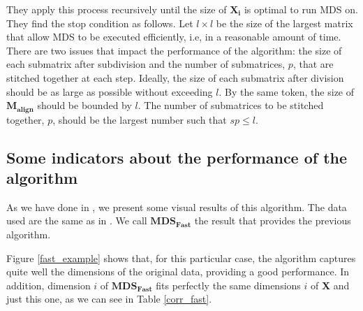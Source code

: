\documentclass[11pt]{report}
\begin{document}
\indent They apply this process recursively until the size of $\mathbf{X_i}$ is
optimal to run MDS on. They find the stop condition as follows. Let 
$l \times l$ be the size of the largest matrix that allow MDS to be executed 
efficiently, i.e, in a reasonable amount of time. There are two issues that 
impact the performance of the algorithm: the size of each submatrix after 
subdivision and the number of submatrices, $p$, that are stitched together 
at each step. Ideally, the size of each submatrix after division should 
be as large as possible without exceeding $l$. By the same token, the size of 
$\mathbf{M_{align}}$ should be bounded by $l$. The number of 
submatrices to be stitched together, $p$, should be the largest number such 
that $sp \leq l$.

\subsection{Some indicators about the performance of the algorithm}
As we have done in , we present some visual results of
this algorithm. The data used are the same as in . We
call $\mathbf{MDS_{Fast}}$ the result that provides the previous algorithm.

\indent Figure \ref{fast_example} shows that, for this particular case,
the algorithm captures quite well the dimensions of the original data, 
providing a good performance. In addition, dimension $i$ of 
$\mathbf{MDS_{Fast}}$ fits perfectly the same dimensions $i$ of \textbf{X} and 
just this one, as we can see in Table \ref{corr_fast}.
\end{document}
